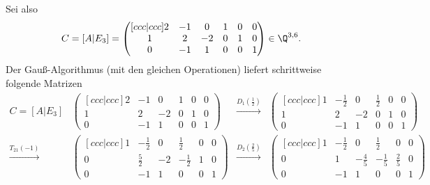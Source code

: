 \documentclass[a4paper]{article}
\begin{document}
Sei also
\begin{equation*}
    C = [A|E_3] = \begin{pmatrix}[ccc|ccc]
        2 & -1 & 0  & 1 & 0 & 0 \\
        1 & 2  & -2 & 0 & 1 & 0 \\
        0 & -1 & 1  & 0 & 0 & 1
    \end{pmatrix} \in \Q^{3, 6}.
\end{equation*}
Der Gauß-Algorithmus (mit den gleichen Operationen) liefert schrittweise folgende Matrizen
\begin{align*}
    C = [A|E_3] & \begin{pmatrix}[ccc|ccc]
                      2 & -1 & 0  & 1 & 0 & 0 \\
                      1 & 2  & -2 & 0 & 1 & 0 \\
                      0 & -1 & 1  & 0 & 0 & 1
                  \end{pmatrix}                                          &
    \xrightarrow{D_1(\frac{1}{2})}
                & \begin{pmatrix}[ccc|ccc]
                      1 & -\frac{1}{2} & 0  & \frac{1}{2} & 0 & 0 \\
                      1 & 2            & -2 & 0           & 1 & 0 \\
                      0 & -1           & 1  & 0           & 0 & 1
                  \end{pmatrix}                      \\
    \xrightarrow{T_{21}(-1)}
                & \begin{pmatrix}[ccc|ccc]
                      1 & -\frac{1}{2} & 0  & \frac{1}{2}  & 0 & 0 \\
                      0 & \frac{5}{2}  & -2 & -\frac{1}{2} & 1 & 0 \\
                      0 & -1           & 1  & 0            & 0 & 1
                  \end{pmatrix}                     &
    \xrightarrow{D_2(\frac{2}{5})}
                & \begin{pmatrix}[ccc|ccc]
                      1 & -\frac{1}{2} & 0            & \frac{1}{2}  & 0           & 0 \\
                      0 & 1            & -\frac{4}{5} & -\frac{1}{5} & \frac{2}{5} & 0 \\
                      0 & -1           & 1            & 0            & 0           & 1
                  \end{pmatrix} \\

\end{align*}
\end{document}

